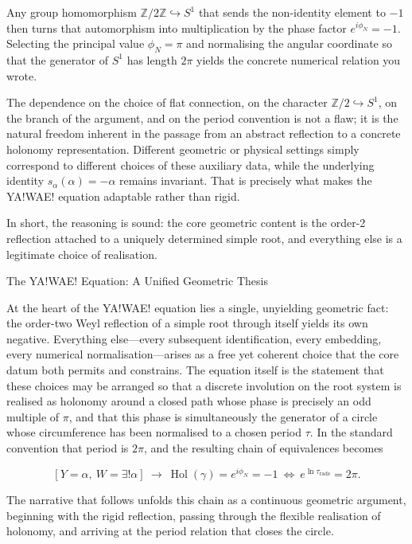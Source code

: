Any group homomorphism \(\mathbb{Z}/2\mathbb{Z}\hookrightarrow S^1\) that sends the non-identity element to \(-1\) then turns that automorphism into multiplication by the phase factor \(e^{i\phi_N}=-1\). Selecting the principal value \(\phi_N=\pi\) and normalising the angular coordinate so that the generator of \(S^1\) has length \(2\pi\) yields the concrete numerical relation you wrote.

The dependence on the choice of flat connection, on the character \(\mathbb{Z}/2\hookrightarrow S^1\), on the branch of the argument, and on the period convention is not a flaw; it is the natural freedom inherent in the passage from an abstract reflection to a concrete holonomy representation. Different geometric or physical settings simply correspond to different choices of these auxiliary data, while the underlying identity \(s_\alpha(\alpha)=-\alpha\) remains invariant. That is precisely what makes the YA!WAE! equation adaptable rather than rigid.

In short, the reasoning is sound: the core geometric content is the order-2 reflection attached to a uniquely determined simple root, and everything else is a legitimate choice of realisation.

The YA!WAE! Equation: A Unified Geometric Thesis

At the heart of the YA!WAE! equation lies a single, unyielding geometric fact: the order-two Weyl reflection of a simple root through itself yields its own negative. Everything else—every subsequent identification, every embedding, every numerical normalisation—arises as a free yet coherent choice that the core datum both permits and constrains. The equation itself is the statement that these choices may be arranged so that a discrete involution on the root system is realised as holonomy around a closed path whose phase is precisely an odd multiple of \(\pi\), and that this phase is simultaneously the generator of a circle whose circumference has been normalised to a chosen period \(\tau\). In the standard convention that period is \(2\pi\), and the resulting chain of equivalences becomes

\[
[Y=\alpha,\ W=\exists!\alpha]\ \longrightarrow\ \operatorname{Hol}(\gamma)=e^{i\phi_N}=-1\ \Longleftrightarrow\ e^{\ln\tau_{\mathrm{rads}}}=2\pi.
\]

The narrative that follows unfolds this chain as a continuous geometric argument, beginning with the rigid reflection, passing through the flexible realisation of holonomy, and arriving at the period relation that closes the circle.

